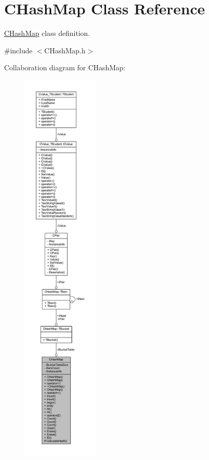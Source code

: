 \hypertarget{class_c_hash_map}{}\section{C\+Hash\+Map Class Reference}
\label{class_c_hash_map}


\hyperlink{class_c_hash_map}{C\+Hash\+Map} class definition.  




{\ttfamily \#include $<$C\+Hash\+Map.\+h$>$}



Collaboration diagram for C\+Hash\+Map\+:\nopagebreak
\begin{figure}[H]
\begin{center}
\leavevmode
\includegraphics[height=550pt]{class_c_hash_map__coll__graph}
\end{center}
\end{figure}
